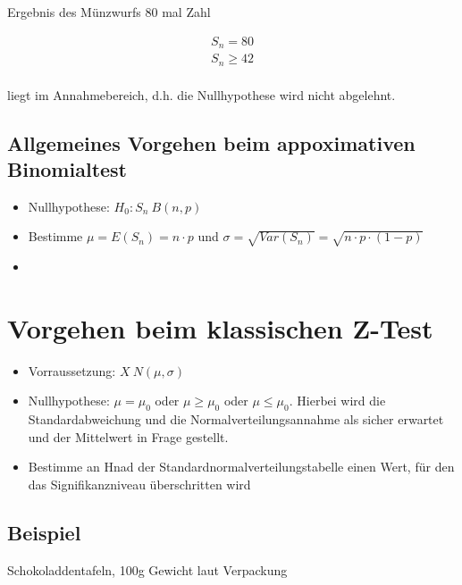 Ergebnis des Münzwurfs 80 mal Zahl

\begin{align*}
    S_n = 80    \\
    S_n \geq 42 \\
\end{align*}

liegt im Annahmebereich, d.h. die Nullhypothese wird nicht abgelehnt.

\subsection{Allgemeines Vorgehen beim appoximativen Binomialtest}

\begin{itemize}
    \item Nullhypothese: $H_0: S_n ~ B(n, p)$
    \item Bestimme $\mu = E(S_n) = n \cdot p$ und $\sigma = \sqrt{Var(S_n)} = \sqrt{n
                  \cdot p \cdot (1 - p)}$
    \item
\end{itemize}

\section{Vorgehen beim klassischen Z-Test}

\begin{itemize}
    \item Vorraussetzung: $X ~ N(\mu, \sigma)$
    \item Nullhypothese: $\mu = \mu_0$ oder $\mu \geq \mu_0$ oder $\mu \leq \mu_0$.
          Hierbei wird die Standardabweichung und die Normalverteilungsannahme als sicher
          erwartet und der Mittelwert in Frage gestellt.
    \item Bestimme an Hnad der Standardnormalverteilungstabelle einen Wert, für den das
          Signifikanzniveau überschritten wird
\end{itemize}

\subsection{Beispiel}

Schokoladdentafeln, 100g Gewicht laut Verpackung

